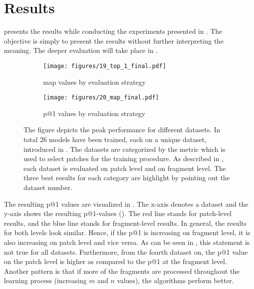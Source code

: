 \chapter{Results}
\label{chap:results}
 presents the results while conducting the experiments presented in . The objective is simply to present the results without further interpreting the meaning. The deeper evaluation will take place in .
%
\begin{figure}
	\centering
	\begin{subfigure}{.45\textwidth}
		\centering		
		\texttt{[image: figures/19\_top\_1\_final.pdf]}
		\caption{\ac{map} values by evaluation strategy}
		\label{fig:top_1_final}
	\end{subfigure}%
	\begin{subfigure}{.45\textwidth}
		\centering
		\texttt{[image: figures/20\_map\_final.pdf]}
		\caption{\ac{p@1} values by evaluation strategy}
		\label{fig:map_final}
	\end{subfigure}
	\caption{The figure depicts the peak performance for different datasets. In total 26 models have been trained, each on a unique dataset, introduced in . The datasets are categorized by the metric which is used to select patches for the training procedure. As described in , each dataset is evaluated on patch level and on fragment level. The three best results for each category are highlight by pointing out the dataset number.}
	\label{fig:final}
\end{figure}
%
The resulting \ac{p@1} values are visualized in . The x-axis denotes a dataset  and the y-axis shows the resulting \ac{p@1}-values (). The red line stands for patch-level results, and the blue line stands for fragment-level results. In general, the results for both levels look similar. Hence, if the \ac{p@1} is increasing on fragment level, it is also increasing on patch level and vice versa. As can be seen in , this statement is not true for all datasets. Furthermore, from the fourth dataset on, the \ac{p@1} value on the patch level is higher as compared to the \ac{p@1} at the fragment level. Another pattern is that if more of the fragments are processed throughout the learning process (increasing \(m\) and \(n\) values), the algorithms perform better.\\

